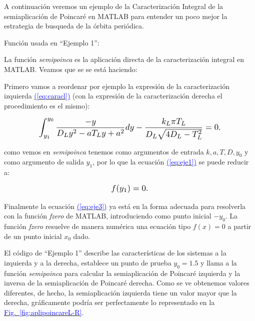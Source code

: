 \documentclass[12pt,a4paper]{report} %
\newcommand{\fref}[1]{\hyperref[#1]{\textcolor{blue}{Fig.~\ref*{#1}}}}
\newcommand{\eref}[1]{\hyperref[#1]{\textcolor{blue}{(\ref*{#1})}}}
\newcommand{\fref}[1]{\hyperref[#1]{\textcolor{blue}{\textit{Fig.~\ref*{#1}}}}}
\newcommand{\eref}[1]{\hyperref[#1]{\textcolor{blue}{\textit{(\ref*{#1})}}}}
\begin{document}
	\vspace{0.5cm} A continuación veremos un ejemplo de la Caracterización Integral de la semiaplicación de Poincaré en MATLAB para entender un poco mejor la estrategia de busqueda de la órbita periódica.
	
	\vspace{1cm}
	
	\vspace{1cm}
	
	\vspace{1cm}\noindent Función usada en ``Ejemplo 1'':
	\vspace{0.5cm}
	
	\newpage
	
	La función \textit{semipoinca} es la aplicación directa de la caracterización integral en MATLAB. Veamos que se se está haciendo:
	
	\vspace{0.5cm}\noindent Primero vamos a reordenar por ejemplo la expresión de la caracterización izquierda \eref{eq:caracl} (con la expresión de la caracterización derecha el procedimiento es el mismo):
	
	\begin{equation}
			\label{eq:eje1}
		\scalebox{1.2}{$\displaystyle
		\begin{gathered}
			\int_{y_1}^{y_0}\frac{-y}{D_Ly^2-aT_Ly+a^2}dy-\frac{k_L\pi T_L}{D_L\sqrt{4D_L-T_L^2}}=0.
		\end{gathered}
			$}
	\end{equation}\smallskip
	
	\noindent como vemos en \textit{semipoinca} tenemos como argumentos de entrada $k,a,T,D,y_0$ y como argumento de salida $y_1$, por lo que la ecuación \eref{eq:eje1} se puede reducir a:
	
		\begin{equation}
		\label{eq:eje3}
		\scalebox{1.2}{$\displaystyle
				f(y_1)=0.
			$}
	\end{equation}\smallskip
	
	\noindent Finalmente la ecuación \eref{eq:eje3} ya está en la forma adecuada para resolverla con la función \textit{fzero} de MATLAB, introduciendo como punto inicial $-y_0$. La función \textit{fzero} resuelve de manera numérica una ecuación tipo $f(x)=0$ a partir de un punto inicial $x_0$ dado.
	
	\vspace{0.5cm}\noindent El código de ``Ejemplo 1'' describe las características de los sistemas a la izquierda y a la derecha, establece un punto de prueba $y_0=1.5$ y llama a la función \textit{semipoinca} para calcular la semiaplicación de Poincaré izquierda y la inversa de la semiaplicación de Poincaré derecha. Como se ve obtenemos valores diferentes, de hecho, la semiaplicación izquierda tiene un valor mayor que la derecha, gráficamente podría ser perfectamente lo representado en la \fref{fig:aplipoincareL-R}.
	\newpage
	
\end{document}
